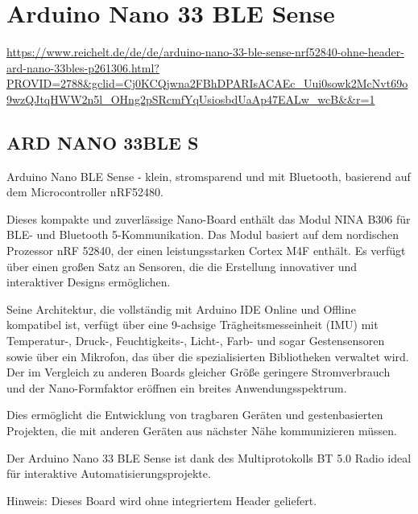 %
%



\section{Arduino Nano 33 BLE Sense}



\url{https://www.reichelt.de/de/de/arduino-nano-33-ble-sense-nrf52840-ohne-header-ard-nano-33bles-p261306.html?PROVID=2788&gclid=Cj0KCQjwna2FBhDPARIsACAEc_Uui0sowk2McNvt69o9wzQJtqHWW2n5l_OHng2pSRcmfYqUsiosbdUaAp47EALw_wcB&&r=1}

\subsection{ARD NANO 33BLE S}

Arduino Nano BLE Sense - klein, stromsparend und mit Bluetooth, basierend auf dem  Microcontroller nRF52480.

Dieses kompakte und zuverlässige Nano-Board enthält das Modul NINA B306 für BLE- und Bluetooth 5-Kommunikation. Das Modul basiert auf dem nordischen Prozessor nRF 52840, der einen leistungsstarken Cortex M4F enthält. Es verfügt über einen großen Satz an Sensoren, die die Erstellung innovativer und interaktiver Designs ermöglichen.

Seine Architektur, die vollständig mit Arduino IDE Online und Offline kompatibel ist, verfügt über eine 9-achsige Trägheitsmesseinheit (IMU) mit Temperatur-, Druck-, Feuchtigkeits-, Licht-, Farb- und sogar Gestensensoren sowie über ein Mikrofon, das über die spezialisierten Bibliotheken verwaltet wird. Der im Vergleich zu anderen Boards gleicher Größe geringere Stromverbrauch und der Nano-Formfaktor eröffnen ein breites Anwendungsspektrum.

Dies ermöglicht die Entwicklung von tragbaren Geräten und gestenbasierten Projekten, die mit anderen Geräten aus nächster Nähe kommunizieren müssen.

Der Arduino Nano 33 BLE Sense ist dank des Multiprotokolls BT 5.0 Radio ideal für interaktive Automatisierungsprojekte.

Hinweis: Dieses Board wird ohne integriertem Header geliefert.



